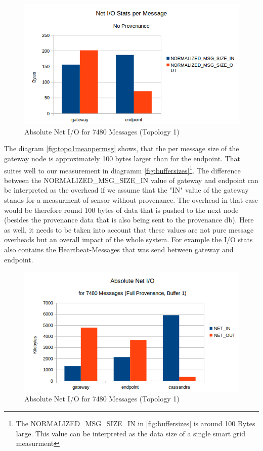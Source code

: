 \begin{figure}[H]
	\center
	\includegraphics[width=\textwidth]{figures/overheaddiagram7.png}
	\caption{Absolute Net I/O for 7480 Messages (Topology 1)}
	\label{fig:topo1absolutenoprov}
\end{figure}

The diagram \ref{fig:topo1meanpermsg} shows, that the per message size of the gateway node is approximately 100 bytes larger than for the endpoint. That suites well to our measurement in diagramm \ref{fig:buffersizes}\footnote{The NORMALIZED\_MSG\_SIZE\_IN in \ref{fig:buffersizes} is around 100 Bytes large. This value can be interpreted as the data size of a single smart grid measurment}. The difference between the NORMALIZED\_MSG\_SIZE\_IN value of gateway and endpoint can be interpreted as the overhead if we assume that the "IN" value of the gateway stands for a measurment of sensor without provenance. The overhead in that case would be therefore round 100 bytes of data that is pushed to the next node (besides the provenance data that is also being sent to the provenance db). Here as well, it needs to be taken into account that these values are not pure message overheads but an overall impact of the whole system. For example the I/O stats also contains the Heartbeat-Messages that was send between gateway and endpoint.


\begin{figure}[H]
	\center
	\includegraphics[width=\textwidth]{figures/overheaddiagram4.png}
	\caption{Absolute Net I/O for 7480 Messages (Topology 1)}
	\label{fig:topo1absoluteprov}
\end{figure}



